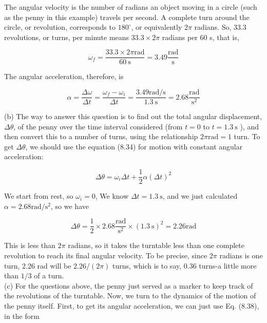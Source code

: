 \documentclass[10pt]{article}
\begin{document}
The angular velocity is the number of radians an object moving in a circle (such as the penny in this example) travels per second. A complete turn around the circle, or revolution, corresponds to $180^{\circ}$, or equivalently $2 \pi$ radians. So, 33.3 revolutions, or turns, per minute means $33.3 \times 2 \pi$ radians per 60 s, that is,


\begin{equation*}
\omega_{f}=\frac{33.3 \times 2 \pi \mathrm{rad}}{60 \mathrm{~s}}=3.49 \frac{\mathrm{rad}}{\mathrm{s}} \tag{8.39}
\end{equation*}


The angular acceleration, therefore, is


\begin{equation*}
\alpha=\frac{\Delta \omega}{\Delta t}=\frac{\omega_{f}-\omega_{i}}{\Delta t}=\frac{3.49 \mathrm{rad} / \mathrm{s}}{1.3 \mathrm{~s}}=2.68 \frac{\mathrm{rad}}{\mathrm{s}^{2}} \tag{8.40}
\end{equation*}


(b) The way to answer this question is to find out the total angular displacement, $\Delta \theta$, of the penny over the time interval considered (from $t=0$ to $t=1.3 \mathrm{~s}$ ), and then convert this to a number of turns, using the relationship $2 \pi \mathrm{rad}=1$ turn. To get $\Delta \theta$, we should use the equation (8.34) for motion with constant angular acceleration:


\begin{equation*}
\Delta \theta=\omega_{i} \Delta t+\frac{1}{2} \alpha(\Delta t)^{2} \tag{8.41}
\end{equation*}


We start from rest, so $\omega_{i}=0$, We know $\Delta t=1.3 \mathrm{~s}$, and we just calculated $\alpha=2.68 \mathrm{rad} / \mathrm{s}^{2}$, so we have


\begin{equation*}
\Delta \theta=\frac{1}{2} \times 2.68 \frac{\mathrm{rad}}{\mathrm{s}^{2}} \times(1.3 \mathrm{~s})^{2}=2.26 \mathrm{rad} \tag{8.42}
\end{equation*}


This is less than $2 \pi$ radians, so it takes the turntable less than one complete revolution to reach its final angular velocity. To be precise, since $2 \pi$ radians is one turn, 2.26 rad will be $2.26 /(2 \pi)$ turns, which is to say, 0.36 turns-a little more than $1 / 3$ of a turn.\\
(c) For the questions above, the penny just served as a marker to keep track of the revolutions of the turntable. Now, we turn to the dynamics of the motion of the penny itself. First, to get its angular acceleration, we can just use Eq. (8.38), in the form
\end{document}
